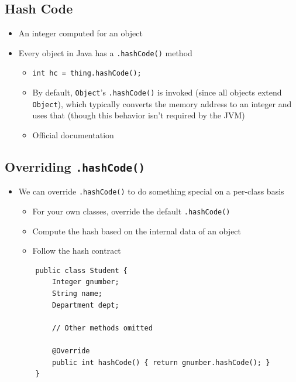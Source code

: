 \documentclass[10pt]{article}
\begin{document}
\subsection*{Hash Code}
\begin{itemize}
    \item An integer computed for an object
    \item Every object in Java has a \texttt{.hashCode()} method
    \begin{itemize}
        \item \texttt{int hc = thing.hashCode();}
        \item By default, \texttt{Object}'s \texttt{.hashCode()} is invoked (since all objects extend \texttt{Object}), which typically converts the memory address to an integer and uses that (though this behavior isn't required by the JVM)
        \item Official documentation
    \end{itemize}
\end{itemize}

\subsection*{Overriding \texttt{.hashCode()}}
\begin{itemize}
    \item We can override \texttt{.hashCode()} to do something special on a per-class basis
    \begin{itemize}
        \item For your own classes, override the default \texttt{.hashCode()}
        \item Compute the hash based on the internal data of an object
        \item Follow the hash contract
    \end{itemize}
    \begin{verbatim}
    public class Student {
        Integer gnumber;
        String name;
        Department dept;

        // Other methods omitted

        @Override
        public int hashCode() { return gnumber.hashCode(); }
    }
    \end{verbatim}
\end{itemize}
\end{document}
